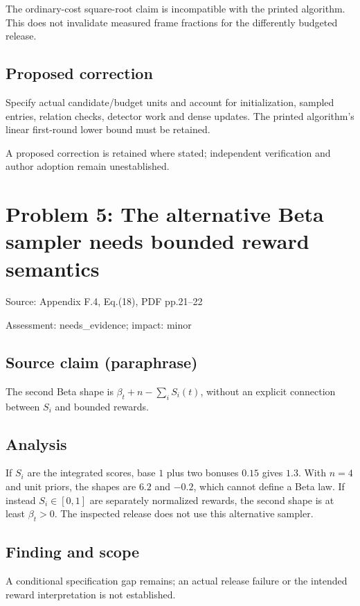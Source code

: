 \documentclass[11pt]{article}
\begin{document}
The ordinary-cost square-root claim is incompatible with the printed algorithm. This does not invalidate measured frame fractions for the differently budgeted release.

\subsection*{Proposed correction}

Specify actual candidate/budget units and account for initialization, sampled entries, relation checks, detector work and dense updates. The printed algorithm’s linear first-round lower bound must be retained.

A proposed correction is retained where stated; independent verification and author adoption remain unestablished.

\section*{Problem 5: The alternative Beta sampler needs bounded reward semantics}

Source: Appendix F.4, Eq.(18), PDF pp.21–22

Assessment: needs\_evidence; impact: minor

\subsection*{Source claim (paraphrase)}

The second Beta shape is \(\beta_t+n-\sum_i S_i(t)\), without an explicit connection between \(S_i\) and bounded rewards.

\subsection*{Analysis}

If \(S_i\) are the integrated scores, base \(1\) plus two bonuses \(0.15\) gives \(1.3\). With \(n=4\) and unit priors, the shapes are \(6.2\) and \(-0.2\), which cannot define a Beta law. If instead \(S_i\in[0,1]\) are separately normalized rewards, the second shape is at least \(\beta_t>0\). The inspected release does not use this alternative sampler.

\subsection*{Finding and scope}

A conditional specification gap remains; an actual release failure or the intended reward interpretation is not established.
\end{document}
